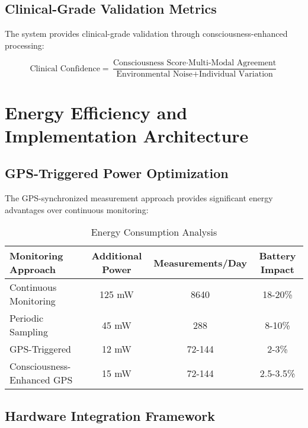 \documentclass[12pt,a4paper]{article}
\begin{document}
\subsection{Clinical-Grade Validation Metrics}

The system provides clinical-grade validation through consciousness-enhanced processing:

\begin{equation}
\text{Clinical Confidence} = \frac{\text{Consciousness Score} \cdot \text{Multi-Modal Agreement}}{\text{Environmental Noise} + \text{Individual Variation}}
\end{equation}

\section{Energy Efficiency and Implementation Architecture}

\subsection{GPS-Triggered Power Optimization}

The GPS-synchronized measurement approach provides significant energy advantages over continuous monitoring:

\begin{table}[htbp]
\centering
\caption{Energy Consumption Analysis}
\begin{tabular}{@{}lccc@{}}
\toprule
\textbf{Monitoring Approach} & \textbf{Additional Power} & \textbf{Measurements/Day} & \textbf{Battery Impact} \\
\midrule
Continuous Monitoring & 125 mW & 8640 & 18-20\% \\
Periodic Sampling & 45 mW & 288 & 8-10\% \\
GPS-Triggered & 12 mW & 72-144 & 2-3\% \\
Consciousness-Enhanced GPS & 15 mW & 72-144 & 2.5-3.5\% \\
\bottomrule
\end{tabular}
\end{table}

\subsection{Hardware Integration Framework}
\end{document}
